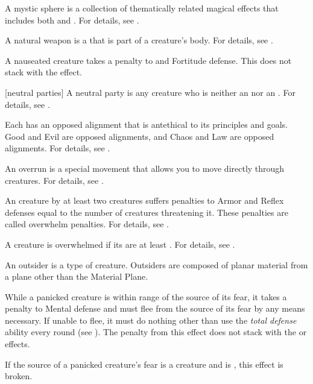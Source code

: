  A mystic sphere is a collection of thematically related magical effects that includes both  and .
For details, see .

 A natural weapon is a  that is part of a creature's body.
For details, see .

 A nauseated creature takes a  penalty to  and Fortitude defense.
This does not stack with the  effect.

[neutral parties] A neutral party is any creature who is neither an  nor an .
For details, see .

 Each  has an opposed alignment that is antethical to its principles and goals.
Good and Evil are opposed alignments, and Chaos and Law are opposed alignments.
For details, see .

 An overrun is a special movement that allows you to move directly through creatures.
For details, see .

 An creature  by at least two creatures suffers penalties to Armor and Reflex defenses equal to the number of creatures threatening it.
These penalties are called overwhelm penalties.
For details, see .

 A creature is overwhelmed if its  are at least .
For details, see .

 An outsider is a type of creature.
Outsiders are composed of planar material from a plane other than the Material Plane.

 While a panicked creature is within \rngmed range of the source of its fear, it takes a  penalty to Mental defense and must flee from the source of its fear by any means necessary.
If unable to flee, it must do nothing other than use the \textit{total defense} ability every round (see ).
The penalty from this effect does not stack with the  or  effects.

If the source of a panicked creature's fear is a creature and is , this effect is broken.

